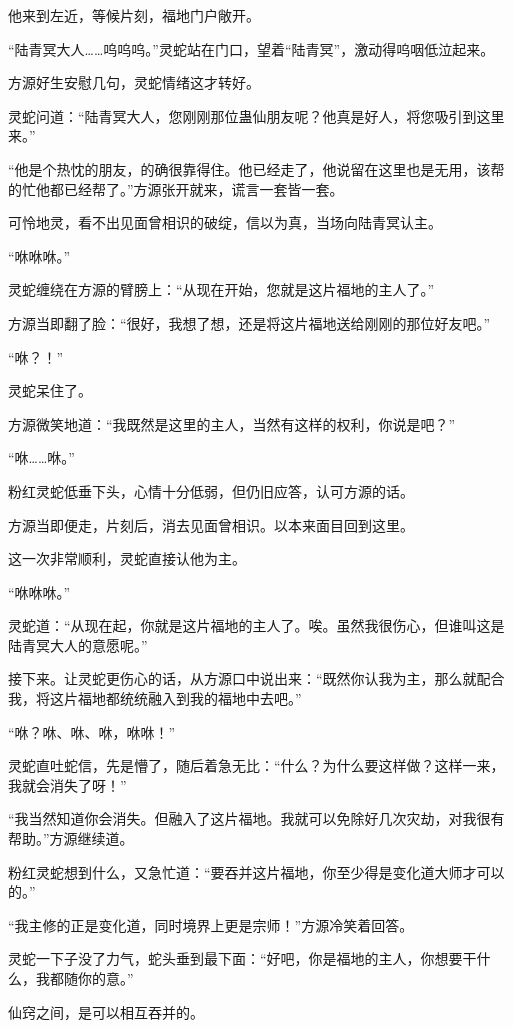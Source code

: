 \begin{this_body}
他来到左近，等候片刻，福地门户敞开。

“陆青冥大人……呜呜呜。”灵蛇站在门口，望着“陆青冥”，激动得呜咽低泣起来。

方源好生安慰几句，灵蛇情绪这才转好。

灵蛇问道：“陆青冥大人，您刚刚那位蛊仙朋友呢？他真是好人，将您吸引到这里来。”

“他是个热忱的朋友，的确很靠得住。他已经走了，他说留在这里也是无用，该帮的忙他都已经帮了。”方源张开就来，谎言一套皆一套。

可怜地灵，看不出见面曾相识的破绽，信以为真，当场向陆青冥认主。

“咻咻咻。”

灵蛇缠绕在方源的臂膀上：“从现在开始，您就是这片福地的主人了。”

方源当即翻了脸：“很好，我想了想，还是将这片福地送给刚刚的那位好友吧。”

“咻？！”

灵蛇呆住了。

方源微笑地道：“我既然是这里的主人，当然有这样的权利，你说是吧？”

“咻……咻。”

粉红灵蛇低垂下头，心情十分低弱，但仍旧应答，认可方源的话。

方源当即便走，片刻后，消去见面曾相识。以本来面目回到这里。

这一次非常顺利，灵蛇直接认他为主。

“咻咻咻。”

灵蛇道：“从现在起，你就是这片福地的主人了。唉。虽然我很伤心，但谁叫这是陆青冥大人的意愿呢。”

接下来。让灵蛇更伤心的话，从方源口中说出来：“既然你认我为主，那么就配合我，将这片福地都统统融入到我的福地中去吧。”

“咻？咻、咻、咻，咻咻！”

灵蛇直吐蛇信，先是懵了，随后着急无比：“什么？为什么要这样做？这样一来，我就会消失了呀！”

“我当然知道你会消失。但融入了这片福地。我就可以免除好几次灾劫，对我很有帮助。”方源继续道。

粉红灵蛇想到什么，又急忙道：“要吞并这片福地，你至少得是变化道大师才可以的。”

“我主修的正是变化道，同时境界上更是宗师！”方源冷笑着回答。

灵蛇一下子没了力气，蛇头垂到最下面：“好吧，你是福地的主人，你想要干什么，我都随你的意。”

仙窍之间，是可以相互吞并的。


\end{this_body}
